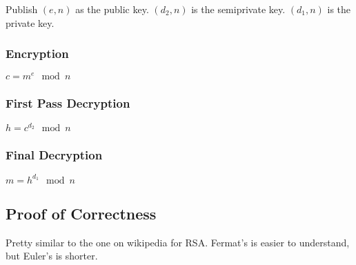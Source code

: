 \documentclass{article}
\begin{document}
Publish $(e,n)$ as the public key.  $(d_2, n)$ is the semiprivate key.  $(d_1, n)$ is the private key. 
\subsubsection{Encryption}
$c = m^{e} \mod n$
\subsubsection{First Pass Decryption}
$h = c^{d_2} \mod n$
\subsubsection{Final Decryption}
$m = h^{d_1} \mod n$
\subsection{Proof of Correctness}
Pretty similar to the one on wikipedia for RSA.  Fermat's is easier to understand, but Euler's is shorter.
\end{document}
